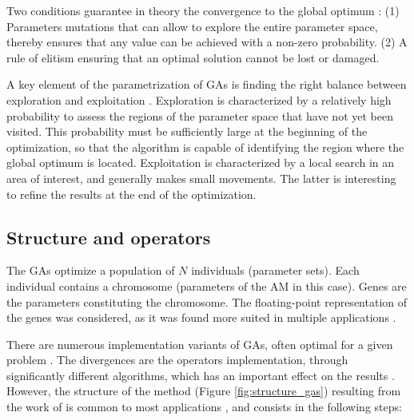 \documentclass[twocol]{ametsoc}
\begin{document}
Two conditions guarantee in theory the convergence to the global optimum \citep{Zitzler2004a}: (1) Parameters mutations that can allow to explore the entire parameter space, thereby ensures that any value can be achieved with a non-zero probability. (2) A rule of elitism ensuring that an optimal solution cannot be lost or damaged.

A key element of the parametrization of GAs is finding the right balance between exploration and exploitation \citep{Back1992a, Smith1997a}. Exploration is characterized by a relatively high probability to assess the regions of the parameter space that have not yet been visited. This probability must be sufficiently large at the beginning of the optimization, so that the algorithm is capable of identifying the region where the global optimum is located. Exploitation is characterized by a local search in an area of interest, and generally makes small movements. The latter is interesting to refine the results at the end of the optimization.


\subsection{Structure and operators}

The GAs optimize a population of $N$ individuals (parameter sets). Each individual contains a chromosome (parameters of the AM in this case). Genes are the parameters constituting the chromosome. The floating-point representation \citep[instead of the canonical binary, see][]{Goldberg1989, Goldberg1990a, Holland1992b} of the genes was considered, as it was found more suited in multiple applications \citep{Michalewicz1996, Herrera1998a, Haupt2004, Back1996b, Gaffney2010a}. 

There are numerous implementation variants of GAs, often optimal for a given problem \citep{Hart1991a, Schraudolph1992a}. The divergences are the operators implementation, through significantly different algorithms, which has an important effect on the results \citep{Gaffney2010a}. However, the structure of the method (Figure \ref{fig:structure_gas}) resulting from the work of \citet{Holland1992b} is common to most applications \citep{Back1993b}, and consists in the following steps:
\end{document}
